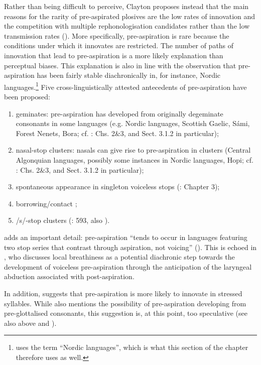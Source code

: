 \documentclass[output=paper]{langscibook}
\begin{document}
Rather than being difficult to perceive, Clayton proposes instead that the main reasons for the rarity of pre-aspirated plosives are the low rates of innovation and the competition with multiple rephonologisation candidates rather than the low transmission rates (\citeyear[86--87]{Clayton2010}). More specifically, pre\hyp aspiration is rare because the conditions under which it innovates are restricted. The number of paths of innovation that lead to pre\hyp aspiration is a more likely explanation than perceptual biases. This explanation is also in line with the observation that pre\hyp aspiration has been fairly stable diachronically in, for instance, Nordic languages.\footnote{\citet{Clayton2010} uses the term “Nordic languages”, which is what this section of the chapter therefore uses as well.} Five cross-linguistically attested antecedents of pre\hyp aspiration have been proposed:

\begin{enumerate}
\item geminates: pre\hyp aspiration has developed from originally degeminate consonants in some languages (e.g. Nordic languages, Scottish Gaelic, Sámi, Forest Nenets, Bora; cf. \citealt{Clayton2010}: Chs. 2\&3, and Sect. 3.1.2 in particular);
\item nasal-stop clusters: nasals can give rise to pre\hyp aspiration in clusters (Central Algonquian languages, possibly some instances in Nordic languages, Hopi; cf. \citealt{Clayton2010}: Chs. 2\&3, and Sect. 3.1.2 in particular);
\item spontaneous appearance in singleton voiceless stops (\citealt{Clayton2010}: Chapter 3);
\item borrowing/contact \citep[61--62]{Helgason2002};
\item /s/-stop clusters (\citealt{Silverman2003}: 593, also \citealt{Suzuki2011}).
\end{enumerate}

\citet{Clayton2010} adds an important detail: pre\hyp aspiration “tends to occur in languages featuring two stop series that contrast through aspiration, not voicing” (\citeyear[33]{Clayton2010}). This is echoed in \citet[e.g. 42]{Hejná2015}, who discusses local breathiness as a potential diachronic step towards the development of voiceless pre\hyp aspiration through the anticipation of the laryngeal abduction associated with post-aspiration.

In addition, \citet[242]{Hejná2015} suggests that pre\hyp aspiration is more likely to innovate in stressed syllables. While \citet[42]{Hejná2015} also mentions the possibility of pre\hyp aspiration developing from pre-glottalised consonants, this suggestion is, at this point, too speculative (see also  above and \citealt{Hejná2023}).
\end{document}
